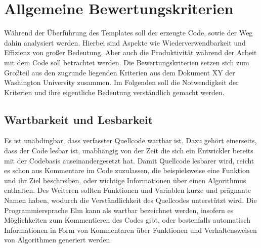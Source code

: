 \section{Allgemeine Bewertungskriterien}
\label{sec:Bewertungskriterien}
Während der Überführung des Templates soll der erzeugte Code, sowie der Weg dahin analysiert werden. Hierbei sind Aspekte wie Wiederverwendbarkeit und Effizienz von großer Bedeutung. Aber auch die Produktivität während der Arbeit mit dem Code soll betrachtet werden. Die Bewertungskriterien setzen sich zum Großteil aus den zugrunde liegenden Kriterien aus dem Dokument XY der Washington University zusammen. Im Folgenden soll die Notwendigkeit der Kriterien und ihre eigentliche Bedeutung verständlich gemacht werden.





\subsection{Wartbarkeit und Lesbarkeit}
\label{sec:muster_wartbarkeit_und_lesbarkeit}
Es ist unabdingbar, dass verfasster Quellcode wartbar ist. Dazu gehört einerseits, dass der Code lesbar ist, unabhängig von der Zeit die sich ein Entwickler bereits mit der Codebasis auseinandergesetzt hat. Damit Quellcode lesbarer wird, reicht es schon aus Kommentare im Code zuzulassen, die beispielsweise eine Funktion und ihr Ziel beschreiben, oder wichtige Informationen über einen Algorithmus enthalten. Des Weiteren sollten Funktionen und Variablen kurze und prägnante Namen haben, wodurch die Verständlichkeit des Quellcodes unterstützt wird. Die Programmiersprache Elm kann als wartbar bezeichnet werden, insofern es Möglichkeiten zum Kommentieren des Codes gibt, oder bestenfalls automatisch Informationen in Form von Kommentaren über Funktionen und Verhaltensweisen von Algorithmen generiert werden.


